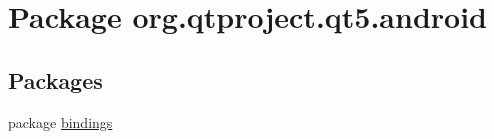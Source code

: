 \hypertarget{namespaceorg_1_1qtproject_1_1qt5_1_1android}{\section{Package org.\+qtproject.\+qt5.\+android}
\label{namespaceorg_1_1qtproject_1_1qt5_1_1android}
}
\subsection*{Packages}
\begin{DoxyCompactItemize}
\item 
package \hyperlink{namespaceorg_1_1qtproject_1_1qt5_1_1android_1_1bindings}{bindings}
\end{DoxyCompactItemize}
